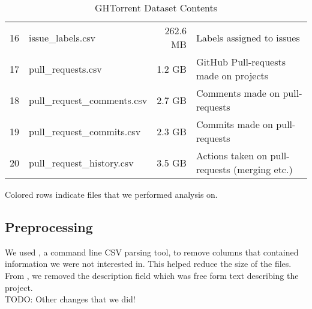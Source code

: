 \begin{table}[htb]
\begin{tabular}{@{}llrl@{}}
           16 & issue\_labels.csv           & 262.6 MB & Labels assigned to issues \\
           \rowcolor{LightCyan}
           17 & pull\_requests.csv          & 1.2 GB   & GitHub Pull-requests made on projects \\
           18 & pull\_request\_comments.csv & 2.7 GB   & Comments made on pull-requests \\
           19 & pull\_request\_commits.csv  & 2.3 GB   & Commits made on pull-requests \\
           20 & pull\_request\_history.csv  & 3.5 GB   & Actions taken on pull-requests (merging etc.) \\

        \bottomrule
    \end{tabular}

    \caption{GHTorrent Dataset Contents}
    \small{Colored rows indicate files that we performed analysis on.}
\end{table}

\newpage
\subsection{Preprocessing}

We used , a command line CSV parsing tool, to remove columns that contained information we were not interested in. This helped reduce the size of the files. \\

From , we removed the description field which was free form text describing the project. \\

\large{ TODO: Other changes that we did! }

